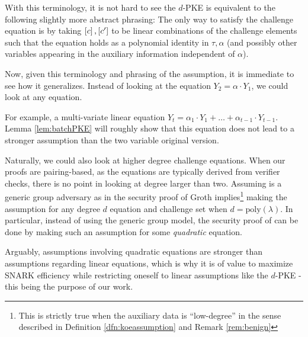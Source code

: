 \documentclass[11pt]{article}
\numberwithin{figure}{section} %
\newcommand{\X}{\ensuremath{\mathbf{X}}\xspace}
\newcommand{\poly}{\ensuremath{\mathrm{poly}(\lambda)}\xspace}
\begin{document}
With this terminology, it is not hard to see the $d$-PKE is equivalent to the following slightly more abstract phrasing:
The only way to satisfy the challenge equation is by taking $\left[c\right],\left[c'\right]$ to be linear combinations of the challenge elements such that the equation holds as a polynomial identity in $\tau,\alpha$ (and possibly other variables appearing in the auxiliary information independent of $\alpha$).

Now, given this terminology and phrasing of the assumption, it is immediate to see how it generalizes.
Instead of looking at the equation $Y_2=\alpha \cdot Y_1$, we could look at any equation.

For example, a multi-variate linear equation
$Y_t= \alpha_1\cdot Y_1 +\ldots + \alpha_{t-1}\cdot Y_{t-1}$.
Lemma \ref{lem:batchPKE} will roughly show that this equation does not lead to a stronger assumption than the two variable original version.
% 

Naturally, we could also look at higher degree challenge equations.
When our proofs are pairing-based, as the equations are typically derived from verifier checks, there is no point in looking at degree larger than two.
Assuming \adv is a generic group adversary as in the security proof of Groth \cite{Groth16} implies\footnote{This is strictly true when the auxiliary data is ``low-degree'' in the sense described in Definition \ref{dfn:koeassumption} and Remark \ref{rem:benign}} making the assumption for any degree $d$ equation and challenge set when $d=\poly$.
In particular, instead of using the generic group model, the security proof of \cite{Groth16} can be done by making such an assumption for some \emph{quadratic} equation.

Arguably, assumptions involving quadratic equations are stronger than assumptions regarding linear equations, which is why it is of value to maximize SNARK efficiency while restricting oneself to linear assumptions like the $d$-PKE - this being the purpose of our work.
\end{document}

